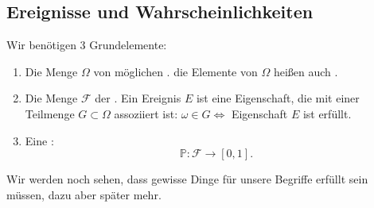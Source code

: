 \subsection{Ereignisse und Wahrscheinlichkeiten}
Wir benötigen 3 Grundelemente:
\begin{enumerate}[(1)]
    \item Die Menge $\Omega$ von möglichen . die Elemente von $\Omega$ heißen auch  .
    \item Die Menge $\mathcal{F}$ der . Ein Ereignis  $E$ ist eine Eigenschaft, die mit einer Teilmenge $G\subset \Omega$ assoziiert ist: $ω\in G \iff $ Eigenschaft $E$ ist erfüllt.
    \item Eine :
        \[
            \mathbb{P}: \mathcal{F} \to  [0,1]
        .\] 
\end{enumerate}
\begin{remark*}
    Wir werden noch sehen, dass gewisse Dinge für unsere Begriffe erfüllt sein müssen, dazu aber später mehr.
\end{remark*}

